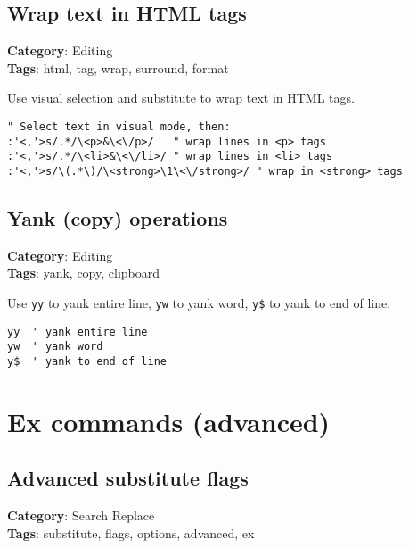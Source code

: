 {{{{{\section{Wrap text in HTML tags}

\textbf{Category}: Editing\\ \textbf{Tags}: html, tag, wrap, surround, format
\vspace{0.5cm}

Use visual selection and substitute to wrap text in HTML tags.

\begin{Exa*}{}
\begin{Verbatim}[fontsize=\footnotesize, breaklines, breakanywhere]
" Select text in visual mode, then:
:'<,'>s/.*/\<p>&\<\/p>/   " wrap lines in <p> tags
:'<,'>s/.*/\<li>&\<\/li>/ " wrap lines in <li> tags
:'<,'>s/\(.*\)/\<strong>\1\<\/strong>/ " wrap in <strong> tags
\end{Verbatim}
\end{Exa*}

\section{Yank (copy) operations}

\textbf{Category}: Editing\\ \textbf{Tags}: yank, copy, clipboard
\vspace{0.5cm}

Use {\footnotesize \Verb§yy§} to yank entire line, {\footnotesize \Verb§yw§} to yank word, {\footnotesize \Verb§y$§} to yank to end of line.

\begin{Exa*}{}
\begin{Verbatim}[fontsize=\footnotesize, breaklines, breakanywhere]
yy  " yank entire line
yw  " yank word
y$  " yank to end of line
\end{Verbatim}
\end{Exa*}

\chapter{Ex commands (advanced)}
\section{Advanced substitute flags}

\textbf{Category}: Search Replace\\ \textbf{Tags}: substitute, flags, options, advanced, ex
\vspace{0.5cm}

}}}}}
